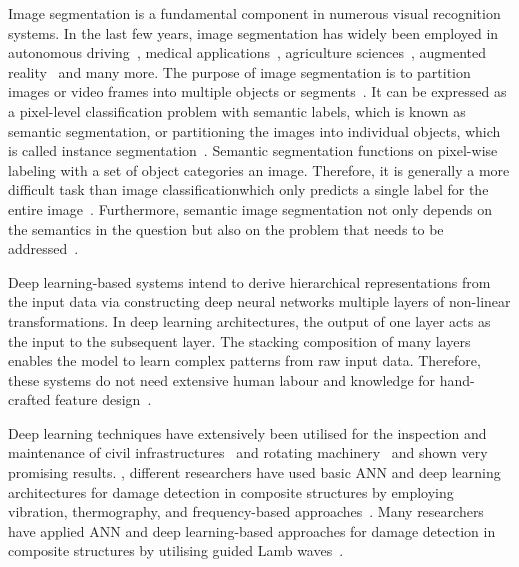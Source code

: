 Image segmentation is a fundamental component in numerous visual recognition
systems. In the last few years, image segmentation has widely been
employed in autonomous driving~\cite{ros2016synthia, li2018real}, medical applications~\cite{taghanaki2021deep}, agriculture sciences~\cite{milioto2018real}, augmented reality~\cite{miksik2015semantic} and many more. 
The purpose of image segmentation is to partition images or video frames into multiple objects or segments~\cite{szeliski2010computer}.
It can be expressed as a pixel-level classification problem with semantic labels, which is known as semantic segmentation, or partitioning the images into individual objects, which is called instance segmentation~\cite{szeliski2010computer, minaee2021image}. 
Semantic segmentation functions on pixel-wise labeling with a set of object categories \DIFdelbegin {}\DIFdelend \DIFaddbegin {}\DIFaddend an image. 
Therefore, it is generally a more difficult task than image classification\DIFaddbegin \DIFadd{, }\DIFaddend which only predicts a single label for the entire image~\cite{minaee2021image}.
Furthermore, semantic image segmentation not only depends on the semantics in the question but also on the problem that needs to be addressed~\cite{ghosh2019understanding}.

Deep learning-based systems intend to derive hierarchical representations from the input data via constructing deep neural networks \DIFdelbegin {}\DIFdelend \DIFaddbegin {}\DIFaddend multiple layers of non-linear transformations.
In deep learning architectures, the output of one layer acts as the input to the \DIFdelbegin {}\DIFdelend \DIFaddbegin {}\DIFaddend subsequent layer.
The stacking composition of many layers enables the model to learn complex patterns from raw input data.
Therefore, these systems do not need extensive human labour and knowledge for hand-crafted feature design~\cite{Zhao2019b}. %

Deep learning techniques have extensively been utilised for the inspection and maintenance of civil infrastructures~\cite{cha2017deep, Lin2017a, Liu2019} and rotating machinery~\cite{janssens2016convolutional, Jia2016a} and \DIFdelbegin {}\DIFdelend \DIFaddbegin {}\DIFaddend shown very promising results.
\DIFdelbegin {}\DIFdelend \DIFaddbegin {}\DIFaddend , different researchers have used basic ANN and deep learning architectures for damage detection in composite structures by employing vibration, thermography, and frequency-based approaches~\cite{chakraborty2005artificial, Khan2019a, luo2019temporal, bang2020defect}. 
Many researchers have applied ANN and deep learning-based approaches for damage detection in composite structures by utilising guided Lamb waves~\cite{Su2004a, chetwynd2008damage, de2015application, feng2019locating, mardanshahi2020detection, qian2020application, Tabian2019, rautela2021ultrasonic}.

